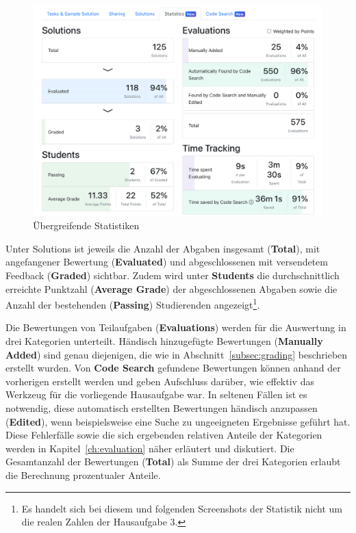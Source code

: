\begin{figure}
    \centering
    \includegraphics[width=\textwidth]{images/assignment-statistics-basics}
    \caption{Übergreifende Statistiken}
    \label{fig:assignment-statistics-basics}
\end{figure}

Unter Solutions ist jeweils die Anzahl der Abgaben insgesamt (\textbf{Total}), mit angefangener Bewertung (\textbf{Evaluated}) und abgeschlossenen mit versendetem Feedback (\textbf{Graded}) sichtbar.
Zudem wird unter \textbf{Students} die durchschnittlich erreichte Punktzahl (\textbf{Average Grade}) der abgeschlossenen Abgaben sowie die Anzahl der bestehenden (\textbf{Passing}) Studierenden angezeigt\footnote{
    Es handelt sich bei diesem und folgenden Screenshots der Statistik nicht um die realen Zahlen der Hausaufgabe 3.
}.

Die Bewertungen von Teilaufgaben (\textbf{Evaluations}) werden für die Auswertung in drei Kategorien unterteilt.
Händisch hinzugefügte Bewertungen (\textbf{Manually Added}) sind genau diejenigen, die wie in Abschnitt~\ref{subsec:grading} beschrieben erstellt wurden.
Von \textbf{Code Search} gefundene Bewertungen können anhand der vorherigen erstellt werden und geben Aufschluss darüber, wie effektiv das Werkzeug für die vorliegende Hausaufgabe war.
In seltenen Fällen ist es notwendig, diese automatisch erstellten Bewertungen händisch anzupassen (\textbf{Edited}), wenn beispielsweise eine Suche zu ungeeigneten Ergebnisse geführt hat.
Diese Fehlerfälle sowie die sich ergebenden relativen Anteile der Kategorien werden in Kapitel~\ref{ch:evaluation} näher erläutert und diskutiert.
Die Gesamtanzahl der Bewertungen (\textbf{Total}) als Summe der drei Kategorien erlaubt die Berechnung prozentualer Anteile.

